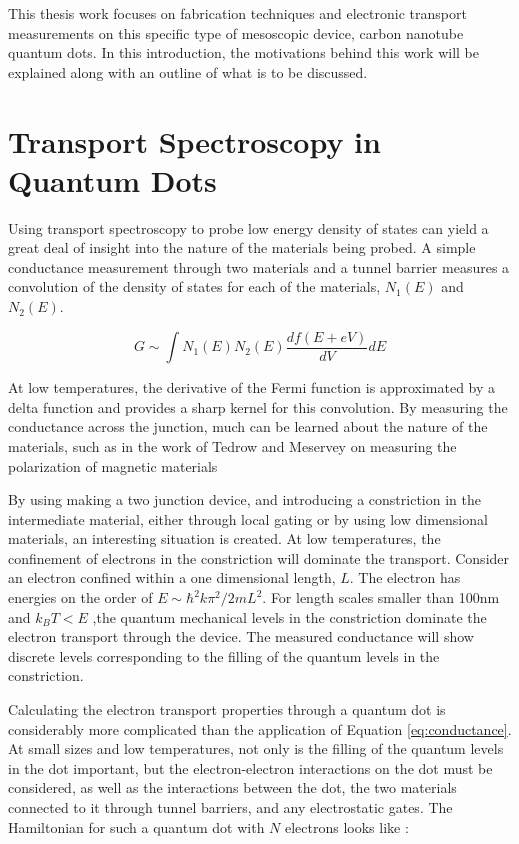 This thesis work focuses on fabrication techniques and electronic transport measurements on this specific type of mesoscopic device, carbon nanotube quantum dots. In this introduction, the motivations behind this work will be explained along with an outline of what is to be discussed. 

\section{Transport Spectroscopy in Quantum Dots}

Using transport spectroscopy to probe low energy density of states can yield a great deal of insight into the nature of the materials being probed. A simple conductance measurement through two materials and a tunnel barrier measures a convolution of the density of states for each of the materials, $N_1(E)$ and $N_2(E)$.

\begin{equation}
    \label{eq:conductance}
    G \sim \int N_1(E) N_2(E)\frac{df(E+eV)}{dV}dE
\end{equation}

At low temperatures, the derivative of the Fermi function is approximated by a delta function and provides a sharp kernel for this convolution. By measuring the conductance across the junction, much can be learned about the nature of the materials, such as in the work of Tedrow and Meservey on measuring the polarization of magnetic materials \cite{Tedrow1971}

By using making a two junction device, and introducing a constriction in the intermediate material, either through local gating or by using low dimensional materials, an interesting situation is created. At low temperatures, the confinement of electrons in the constriction will dominate the transport. Consider an electron confined within a one dimensional length, $L$. The electron has energies on the order of $E \sim \hbar^2k \pi^2/2mL^2$. For length scales smaller than 100nm and $k_B T < E$ ,the quantum mechanical levels in the constriction dominate the electron transport through the device. The measured conductance will show discrete levels corresponding to the filling of the quantum levels in the constriction.

Calculating the electron transport properties through a quantum dot is considerably more complicated than the application of Equation \ref{eq:conductance}. At small sizes and low temperatures, not only is the filling of the quantum levels in the dot important, but the electron-electron interactions on the dot must be considered, as well as the interactions between the dot, the two materials connected to it through tunnel barriers, and any electrostatic gates. The Hamiltonian for such a quantum dot with $N$ electrons looks like \cite{Ihn2004}:

